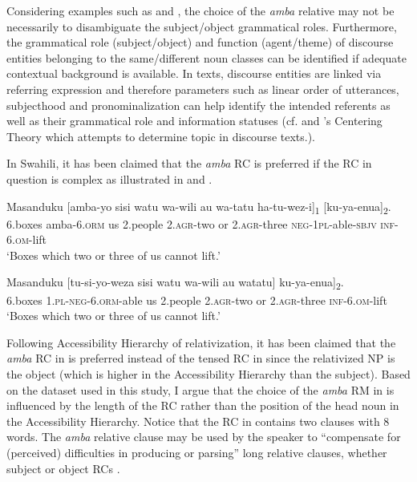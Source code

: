 \documentclass[output=paper,colorlinks,citecolor=brown]{langscibook}
\begin{document}
Considering examples such as  and , the choice of the \textit{amba} relative may not be necessarily to disambiguate the subject/object grammatical roles. Furthermore, the grammatical role (subject/object) and function (agent/theme) of discourse entities belonging to the same/different noun classes can be identified if adequate contextual background is available. In texts, discourse entities are linked via referring expression and therefore parameters such as linear order of utterances, subjecthood and pronominalization can help identify the intended referents as well as their grammatical role and information statuses (cf. \citealt{GroszEtAl1995} and \citeauthor{GroszSidner1998}'s \citeyear{GroszSidner1998} Centering Theory which attempts to determine topic in discourse texts.).

In Swahili, it has been claimed that the \textit{amba} RC is preferred if the RC in question is complex as illustrated in  and .

\ea%
    \label{ex:mwamzandi:12}
    \gll    Masanduku  [amba-yo sisi watu wa-wili au wa-tatu ha-tu-wez-i]\textsubscript{1} [ku-ya-enua]\textsubscript{2}.\\
            6.boxes  amba\textsc{-6.orm} us 2.people \textsc{2.agr-}two or \textsc{2.agr-}three  \textsc{neg-1pl-}able\textsc{-sbjv} \textsc{inf-6.om-}lift\\
    \glt    ‘Boxes which two or three of us cannot lift.’
\z

\ea%
    \label{ex:mwamzandi:13}
    \gll    Masanduku [tu-si-yo-weza sisi watu wa-wili au watatu] ku-ya-enua]\textsubscript{2}.\\
            6.boxes  \textsc{1.pl-neg-6.orm-}able us 2.people \textsc{2.agr-}two or \textsc{2.agr-}three \textsc{inf-6.om-}lift\\
    \glt    ‘Boxes which two or three of us cannot lift.’ \hfill \citep[310]{Ashton1944}
\z

Following  Accessibility Hierarchy of relativization, it has been claimed that the \textit{amba} RC in  is preferred  instead of the tensed RC in  since the relativized NP is the object (which is higher in the Accessibility Hierarchy than the subject). Based on the dataset used in this study, I argue that the choice of the \textit{amba} RM in  is influenced by the length of the RC rather than the position of the head noun in the Accessibility Hierarchy. Notice that the RC in  contains two clauses with 8 words. The \textit{amba} relative clause may be used by the speaker to “compensate for (perceived) difficulties in producing or parsing” long relative clauses, whether subject or object RCs \citep[133]{Green2008}.
\end{document}
